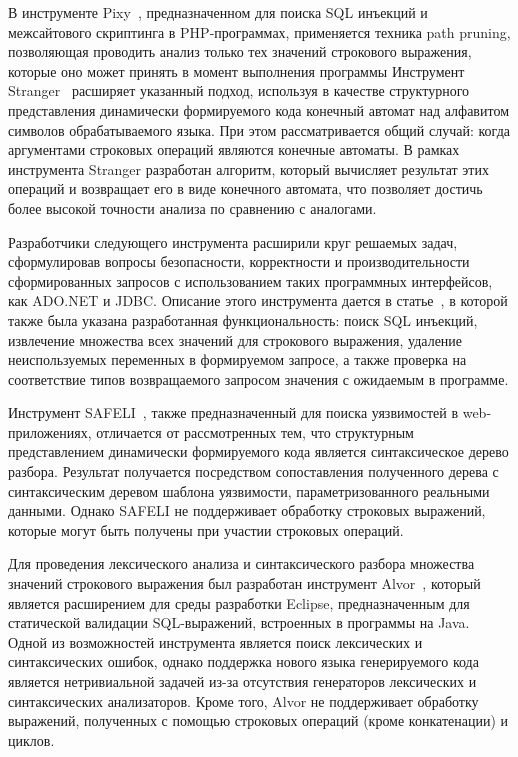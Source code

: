 \documentclass[10pt, conference, compsocconf]{IEEEtran}
\begin{document}
В инструменте Pixy~\cite{Pixy}, предназначенном для поиска SQL инъекций  и межсайтового скриптинга в PHP-программах, применяется техника path pruning, позволяющая проводить анализ только тех значений строкового выражения, которые оно может принять в момент выполнения программы Инструмент Stranger~\cite{Stranger} расширяет указанный подход, используя в качестве структурного представления динамически формируемого кода конечный автомат над алфавитом символов обрабатываемого языка. При этом рассматривается общий случай: когда аргументами строковых операций являются конечные автоматы. В рамках инструмента Stranger разработан алгоритм, который вычисляет результат этих операций и возвращает его в виде конечного автомата, что позволяет достичь более высокой точности анализа по сравнению с аналогами.  

Разработчики следующего инструмента расширили круг решаемых задач, сформулировав вопросы  безопасности, корректности и производительности сформированных запросов с использованием таких программных интерфейсов, как ADO.NET и JDBC. Описание этого инструмента дается в статье~\cite{StaticFrame}, в которой также была указана разработанная функциональность: поиск SQL инъекций, извлечение множества всех значений для строкового выражения, удаление неиспользуемых переменных в формируемом запросе, а также проверка на соответствие типов возвращаемого запросом значения с ожидаемым в программе.  

Инструмент SAFELI~\cite{SAFELI}, также предназначенный для поиска уязвимостей в web-приложениях, отличается от рассмотренных тем, что структурным представлением динамически формируемого кода является синтаксическое дерево разбора. Результат получается посредством сопоставления полученного дерева с синтаксическим деревом шаблона уязвимости, параметризованного реальными данными. Однако SAFELI не поддерживает обработку строковых выражений, которые могут быть получены при участии строковых операций. 

Для проведения лексического анализа и синтаксического разбора множества значений строкового выражения был разработан инструмент Alvor~\cite{Alvor}, который является расширением для среды разработки Eclipse, предназначенным для статической валидации SQL-выражений, встроенных в программы на Java. Одной из  возможностей инструмента является поиск лексических и синтаксических ошибок, однако поддержка нового языка генерируемого кода является нетривиальной задачей из-за отсутствия генераторов лексических и синтаксических анализаторов. Кроме того, Alvor не поддерживает обработку выражений, полученных с помощью строковых операций (кроме конкатенации) и циклов. 
\end{document}
